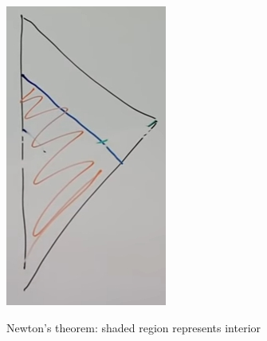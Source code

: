 \documentclass[]{article}
\begin{document}
{\begin{figure}[H]
\begin{subfigure}{0.3\textwidth}
	\end{subfigure}
	\;
	\begin{subfigure}{0.3\textwidth}
		\caption{Newton's theorem: shaded region represents interior}
		\includegraphics[width=\textwidth]{gr-8-newton}\label{fig:gr-8-newton}
	\end{subfigure}
	\;
	\begin{subfigure}{0.3\textwidth}

\end{subfigure}
\end{figure}}
\end{document}

